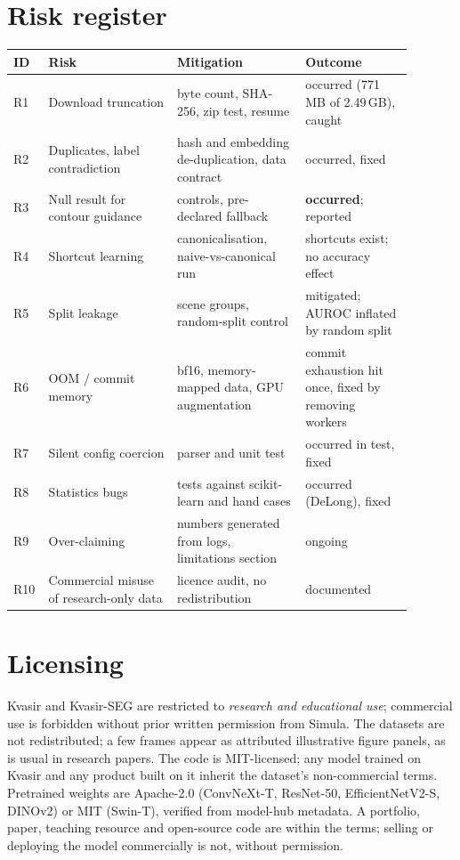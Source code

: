 \section{Risk register}
\begin{table}[h]
\centering\small
\begin{tabular}{p{0.04\linewidth}p{0.3\linewidth}p{0.3\linewidth}p{0.25\linewidth}}
\toprule
ID & Risk & Mitigation & Outcome \\
\midrule
R1 & Download truncation & byte count, SHA-256, zip test, resume & occurred (771\,MB of 2.49\,GB), caught \\
R2 & Duplicates, label contradiction & hash and embedding de-duplication, data contract & occurred, fixed \\
R3 & Null result for contour guidance & controls, pre-declared fallback & \textbf{occurred}; reported \\
R4 & Shortcut learning & canonicalisation, naive-vs-canonical run & shortcuts exist; no accuracy effect \\
R5 & Split leakage & scene groups, random-split control & mitigated; AUROC inflated by random split \\
R6 & OOM / commit memory & bf16, memory-mapped data, GPU augmentation & commit exhaustion hit once, fixed by removing workers \\
R7 & Silent config coercion & parser and unit test & occurred in test, fixed \\
R8 & Statistics bugs & tests against scikit-learn and hand cases & occurred (DeLong), fixed \\
R9 & Over-claiming & numbers generated from logs, limitations section & ongoing \\
R10 & Commercial misuse of research-only data & licence audit, no redistribution & documented \\
\bottomrule
\end{tabular}
\end{table}

\section{Licensing}
Kvasir and Kvasir-SEG are restricted to \emph{research and educational use}; commercial use is forbidden without prior written permission from Simula. The datasets are not redistributed; a few frames appear as attributed illustrative figure panels, as is usual in research papers.
The code is MIT-licensed; any model trained on Kvasir and any product built on it inherit the dataset's non-commercial terms. Pretrained weights are Apache-2.0 (ConvNeXt-T, ResNet-50,
EfficientNetV2-S, DINOv2) or MIT (Swin-T), verified from model-hub metadata. A portfolio, paper, teaching resource and open-source code are within the terms; selling or deploying the model commercially is not, without permission.
